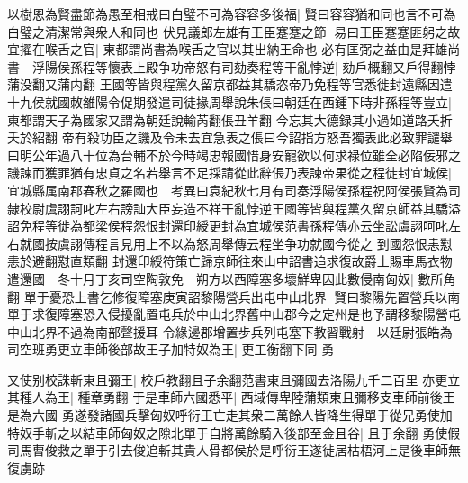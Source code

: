 以樹恩為賢盡節為愚至相戒曰白璧不可為容容多後福|{
	賢曰容容猶和同也言不可為白璧之清潔常與衆人和同也}
伏見議郎左雄有王臣蹇蹇之節|{
	易曰王臣蹇蹇匪躬之故}
宜擢在喉舌之官|{
	東都謂尚書為喉舌之官以其出納王命也}
必有匡弼之益由是拜雄尚書　浮陽侯孫程等懷表上殿争功帝怒有司劾奏程等干亂悖逆|{
	劾戶概翻又戶得翻悖蒲没翻又蒲内翻}
王國等皆與程黨久留京都益其驕恣帝乃免程等官悉徙封遠縣因遣十九侯就國敇雒陽令促期發遣司徒掾周舉說朱倀曰朝廷在西鍾下時非孫程等豈立|{
	東都謂天子為國家又謂為朝廷說輸芮翻倀丑羊翻}
今忘其大德録其小過如道路夭折|{
	夭於紹翻}
帝有殺功臣之譏及令未去宜急表之倀曰今詔指方怒吾獨表此必致罪譴舉曰明公年過八十位為台輔不於今時竭忠報國惜身安寵欲以何求禄位雖全必陷佞邪之譏諫而獲罪猶有忠貞之名若舉言不足採請從此辭倀乃表諫帝果從之程徙封宜城侯|{
	宜城縣属南郡春秋之羅國也　考異曰袁紀秋七月有司奏浮陽侯孫程祝阿侯張賢為司隸校尉虞詡訶叱左右謗訕大臣妄造不祥干亂悖逆王國等皆與程黨久留京師益其驕溢詔免程等徙為都梁侯程怨恨封還印綬更封為宜城侯范書孫程傳亦云坐訟虞詡呵叱左右就國按虞詡傳程言見用上不以為怒周舉傳云程坐争功就國今從之}
到國怨恨恚懟|{
	恚於避翻懟直類翻}
封還印綬符策亡歸京師往來山中詔書追求復故爵土賜車馬衣物遣還國　冬十月丁亥司空陶敦免　朔方以西障塞多壞鮮卑因此數侵南匈奴|{
	數所角翻}
單于憂恐上書乞修復障塞庚寅詔黎陽營兵出屯中山北界|{
	賢曰黎陽先置營兵以南單于求復障塞恐入侵擾亂置屯兵於中山北界舊中山郡今之定州是也予謂移黎陽營屯中山北界不過為南部聲援耳}
令緣邊郡增置步兵列屯塞下教習戰射　以廷尉張皓為司空班勇更立車師後部故王子加特奴為王|{
	更工衡翻下同}
勇

又使别校誅斬東且彌王|{
	校戶教翻且子余翻范書東且彌國去洛陽九千二百里}
亦更立其種人為王|{
	種章勇翻}
于是車師六國悉平|{
	西域傳卑陸蒲類東且彌移支車師前後王是為六國}
勇遂發諸國兵擊匈奴呼衍王亡走其衆二萬餘人皆降生得單于從兄勇使加特奴手斬之以結車師匈奴之隙北單于自將萬餘騎入後部至金且谷|{
	且于余翻}
勇使假司馬曹俊救之單于引去俊追斬其貴人骨都侯於是呼衍王遂徙居枯梧河上是後車師無復虜跡

